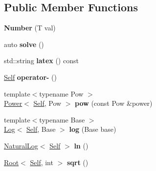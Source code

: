 \subsection*{Public Member Functions}
\begin{DoxyCompactItemize}
\item 
\hypertarget{classlatex_1_1math_1_1Number_ad95c73319da794a949d07258f3cd23f3}{{\bfseries Number} (T val)}\label{classlatex_1_1math_1_1Number_ad95c73319da794a949d07258f3cd23f3}

\item 
\hypertarget{classlatex_1_1math_1_1Number_a828245764da36255de6fc5de3ff419cf}{auto {\bfseries solve} ()}\label{classlatex_1_1math_1_1Number_a828245764da36255de6fc5de3ff419cf}

\item 
\hypertarget{classlatex_1_1math_1_1Number_a4ba49b934f893e3582f755a2830cc9f5}{std\-::string {\bfseries latex} () const }\label{classlatex_1_1math_1_1Number_a4ba49b934f893e3582f755a2830cc9f5}

\item 
\hypertarget{classlatex_1_1math_1_1Number_a8ab91d58fe8e6708b72d53fb0266b9c9}{\hyperlink{classlatex_1_1math_1_1Number}{Self} {\bfseries operator-\/} ()}\label{classlatex_1_1math_1_1Number_a8ab91d58fe8e6708b72d53fb0266b9c9}

\item 
\hypertarget{classlatex_1_1math_1_1Number_a38bc3ef8f9a2e19967b93e5dae02af82}{{\footnotesize template$<$typename Pow $>$ }\\\hyperlink{classlatex_1_1math_1_1Power}{Power}$<$ \hyperlink{classlatex_1_1math_1_1Number}{Self}, Pow $>$ {\bfseries pow} (const Pow \&power)}\label{classlatex_1_1math_1_1Number_a38bc3ef8f9a2e19967b93e5dae02af82}

\item 
\hypertarget{classlatex_1_1math_1_1Number_af8ac2784e513ee0761c9a42972fc9744}{{\footnotesize template$<$typename Base $>$ }\\\hyperlink{classlatex_1_1math_1_1Log}{Log}$<$ \hyperlink{classlatex_1_1math_1_1Number}{Self}, Base $>$ {\bfseries log} (Base base)}\label{classlatex_1_1math_1_1Number_af8ac2784e513ee0761c9a42972fc9744}

\item 
\hypertarget{classlatex_1_1math_1_1Number_a5a808cf6ecbb48144d85cad64def6b42}{\hyperlink{classlatex_1_1math_1_1NaturalLog}{Natural\-Log}$<$ \hyperlink{classlatex_1_1math_1_1Number}{Self} $>$ {\bfseries ln} ()}\label{classlatex_1_1math_1_1Number_a5a808cf6ecbb48144d85cad64def6b42}

\item 
\hypertarget{classlatex_1_1math_1_1Number_a41e6361f370fe20ed6bf147807d8edb3}{\hyperlink{classlatex_1_1math_1_1Root}{Root}$<$ \hyperlink{classlatex_1_1math_1_1Number}{Self}, int $>$ {\bfseries sqrt} ()}\label{classlatex_1_1math_1_1Number_a41e6361f370fe20ed6bf147807d8edb3}

\end{DoxyCompactItemize}
